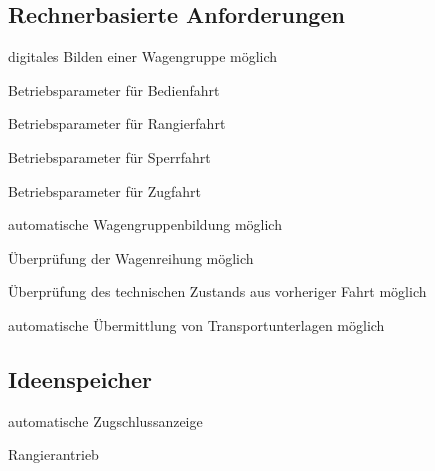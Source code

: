 \subsection{Rechnerbasierte Anforderungen}
\begin{feat}
digitales Bilden einer Wagengruppe möglich
\end{feat}
\begin{feat}
Betriebsparameter für Bedienfahrt
\end{feat}
\begin{feat}
Betriebsparameter für Rangierfahrt
\end{feat}
\begin{feat}
Betriebsparameter für Sperrfahrt
\end{feat}
\begin{feat}
Betriebsparameter für Zugfahrt	
\end{feat}
\begin{feat}
automatische Wagengruppenbildung möglich
\end{feat}
\begin{feat}
Überprüfung der Wagenreihung möglich
\end{feat}
\begin{feat}
Überprüfung des technischen Zustands aus vorheriger Fahrt möglich
\end{feat}
\begin{feat}
automatische Übermittlung von Transportunterlagen möglich
\end{feat}

\subsection{Ideenspeicher}
\begin{feat}
automatische Zugschlussanzeige
\end{feat}
\begin{feat}
Rangierantrieb
\end{feat}